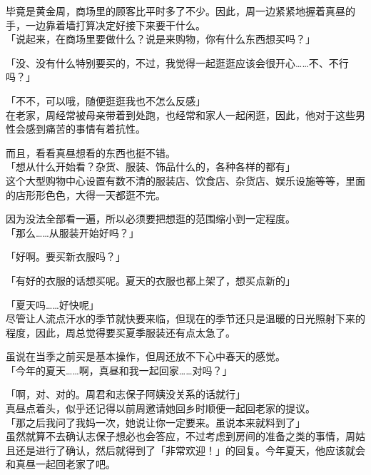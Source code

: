 毕竟是黄金周，商场里的顾客比平时多了不少。因此，周一边紧紧地握着真昼的手，一边靠着墙打算决定好接下来要干什么。\\

「说起来，在商场里要做什么？说是来购物，你有什么东西想买吗？」

「没、没有什么特别要买的，不过，我觉得一起逛逛应该会很开心……不、不行吗？」

「不不，可以哦，随便逛逛我也不怎么反感」\\

在老家，周经常被母亲带着到处跑，也经常和家人一起闲逛，因此，他对于这些男性会感到痛苦的事情有着抗性。

而且，看看真昼想看的东西也挺不错。\\

「想从什么开始看？杂货、服装、饰品什么的，各种各样的都有」\\

这个大型购物中心设置有数不清的服装店、饮食店、杂货店、娱乐设施等等，里面的店形形色色，大得一天都逛不完。

因为没法全部看一遍，所以必须要把想逛的范围缩小到一定程度。\\

「那么……从服装开始好吗？」

「好啊。要买新衣服吗？」

「有好的衣服的话想买呢。夏天的衣服也都上架了，想买点新的」

「夏天吗……好快呢」\\

尽管让人流点汗水的季节就快要来临，但现在的季节还只是温暖的日光照射下来的程度，因此，周总觉得要买夏季服装还有点太急了。

虽说在当季之前买是基本操作，但周还放不下心中春天的感觉。\\

「今年的夏天……啊，真昼和我一起回家……对吗？」

「啊，对、对的。周君和志保子阿姨没关系的话就行」\\

真昼点着头，似乎还记得以前周邀请她回乡时顺便一起回老家的提议。\\

「那之后我问了我妈一次，她说让你一定要来。虽说本来就料到了」\\

虽然就算不去确认志保子想必也会答应，不过考虑到房间的准备之类的事情，周姑且还是进行了确认，然后就得到了「非常欢迎！」的回复。今年夏天，他应该就会和真昼一起回老家了吧。\\

